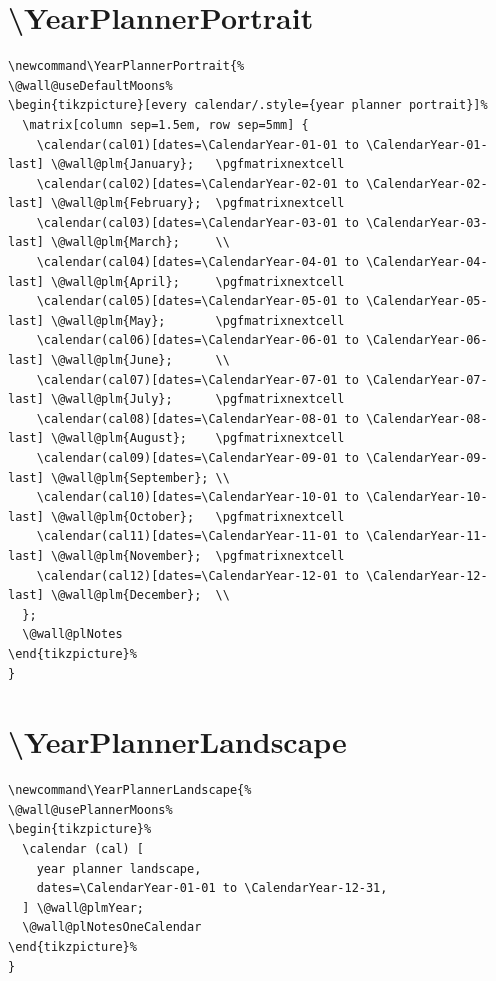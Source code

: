 \documentclass[11pt,oneside]{memoir-article}
\begin{document}
\section{\textbackslash YearPlannerPortrait}
\label{sec:orga0ca64f}

\begin{verbatim}
\newcommand\YearPlannerPortrait{%
\@wall@useDefaultMoons%
\begin{tikzpicture}[every calendar/.style={year planner portrait}]%
  \matrix[column sep=1.5em, row sep=5mm] {
    \calendar(cal01)[dates=\CalendarYear-01-01 to \CalendarYear-01-last] \@wall@plm{January};   \pgfmatrixnextcell
    \calendar(cal02)[dates=\CalendarYear-02-01 to \CalendarYear-02-last] \@wall@plm{February};  \pgfmatrixnextcell
    \calendar(cal03)[dates=\CalendarYear-03-01 to \CalendarYear-03-last] \@wall@plm{March};     \\
    \calendar(cal04)[dates=\CalendarYear-04-01 to \CalendarYear-04-last] \@wall@plm{April};     \pgfmatrixnextcell
    \calendar(cal05)[dates=\CalendarYear-05-01 to \CalendarYear-05-last] \@wall@plm{May};       \pgfmatrixnextcell
    \calendar(cal06)[dates=\CalendarYear-06-01 to \CalendarYear-06-last] \@wall@plm{June};      \\
    \calendar(cal07)[dates=\CalendarYear-07-01 to \CalendarYear-07-last] \@wall@plm{July};      \pgfmatrixnextcell
    \calendar(cal08)[dates=\CalendarYear-08-01 to \CalendarYear-08-last] \@wall@plm{August};    \pgfmatrixnextcell
    \calendar(cal09)[dates=\CalendarYear-09-01 to \CalendarYear-09-last] \@wall@plm{September}; \\
    \calendar(cal10)[dates=\CalendarYear-10-01 to \CalendarYear-10-last] \@wall@plm{October};   \pgfmatrixnextcell
    \calendar(cal11)[dates=\CalendarYear-11-01 to \CalendarYear-11-last] \@wall@plm{November};  \pgfmatrixnextcell
    \calendar(cal12)[dates=\CalendarYear-12-01 to \CalendarYear-12-last] \@wall@plm{December};  \\
  };
  \@wall@plNotes
\end{tikzpicture}%
}
\end{verbatim}

\section{\textbackslash YearPlannerLandscape}
\label{sec:org6538f2f}

\begin{verbatim}
\newcommand\YearPlannerLandscape{%
\@wall@usePlannerMoons%
\begin{tikzpicture}%
  \calendar (cal) [
    year planner landscape,
    dates=\CalendarYear-01-01 to \CalendarYear-12-31,
  ] \@wall@plmYear;
  \@wall@plNotesOneCalendar
\end{tikzpicture}%
}
\end{verbatim}
\end{document}
